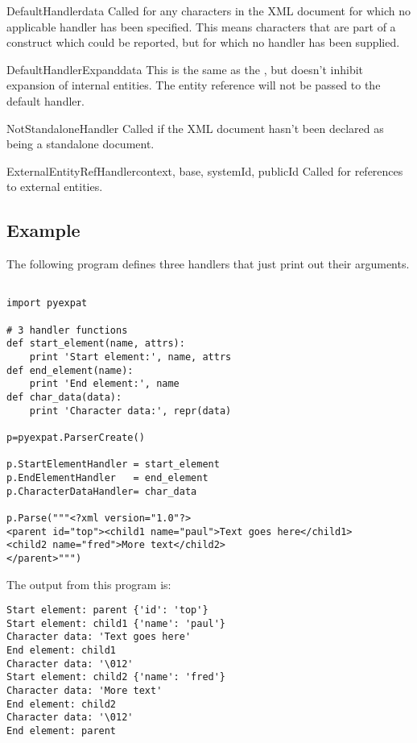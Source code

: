 \begin{methoddesc}{DefaultHandler}{data}
Called for any characters in the XML document for
which no applicable handler has been specified.  This means
characters that are part of a construct which could be reported, but
for which no handler has been supplied. 
\end{methoddesc}

\begin{methoddesc}{DefaultHandlerExpand}{data}
This is the same as the , 
but doesn't inhibit expansion of internal entities.
The entity reference will not be passed to the default handler.
\end{methoddesc}

\begin{methoddesc}{NotStandaloneHandler}{}
Called if the XML document hasn't been declared as being a standalone document.
\end{methoddesc}

\begin{methoddesc}{ExternalEntityRefHandler}{context, base, systemId, publicId}
Called for references to external entities.  
\end{methoddesc}


\subsection{Example \label{pyexpat-example}}

The following program defines three handlers that just print out their
arguments.

\begin{verbatim}

import pyexpat

# 3 handler functions
def start_element(name, attrs):
    print 'Start element:', name, attrs
def end_element(name):
    print 'End element:', name
def char_data(data):
    print 'Character data:', repr(data)

p=pyexpat.ParserCreate()

p.StartElementHandler = start_element
p.EndElementHandler   = end_element
p.CharacterDataHandler= char_data

p.Parse("""<?xml version="1.0"?>
<parent id="top"><child1 name="paul">Text goes here</child1>
<child2 name="fred">More text</child2>
</parent>""")
\end{verbatim}

The output from this program is:

\begin{verbatim}
Start element: parent {'id': 'top'}
Start element: child1 {'name': 'paul'}
Character data: 'Text goes here'
End element: child1
Character data: '\012'
Start element: child2 {'name': 'fred'}
Character data: 'More text'
End element: child2
Character data: '\012'
End element: parent
\end{verbatim}


